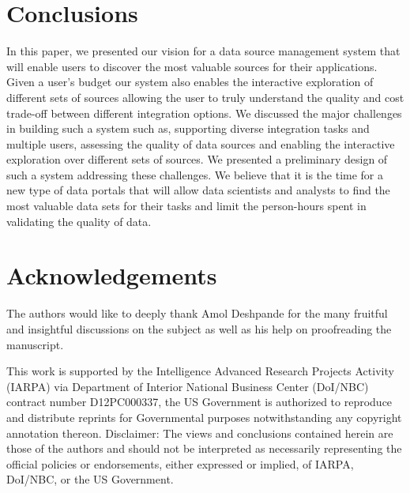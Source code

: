 \documentclass{sig-alternate}
\begin{document}
\section{Conclusions}
\label{sec:conclusion}
In this paper, we presented our vision for a data source management system that will enable users to discover the most valuable sources for their applications. Given a user's budget our system also enables the interactive exploration of different sets of sources allowing the user to truly understand the quality and cost trade-off between different integration options. We discussed the major challenges in building such a system such as, supporting diverse integration tasks and multiple users, assessing the quality of data sources and enabling the interactive exploration over different sets of sources. We presented a preliminary design of such a system addressing these challenges. We believe that it is the time for a new type of data portals that will allow data scientists and analysts to find the most valuable data sets for their tasks and limit the person-hours spent in validating the quality of data. 

\vspace{-5pt}\section*{Acknowledgements}
The authors would like to deeply thank Amol Deshpande for the many fruitful and insightful discussions on the subject as well as his help on 
proofreading the manuscript. 

This work is supported by the Intelligence Advanced Research Projects Activity (IARPA) via Department of Interior National Business Center (DoI/NBC) contract number D12PC000337, the US Government is authorized to reproduce and distribute reprints for Governmental purposes notwithstanding any copyright annotation thereon. Disclaimer: The views and conclusions contained herein are those of the authors and should
not be interpreted as necessarily representing the official policies or endorsements, either expressed or implied, of IARPA, DoI/NBC, or the
US Government.
\end{document}
